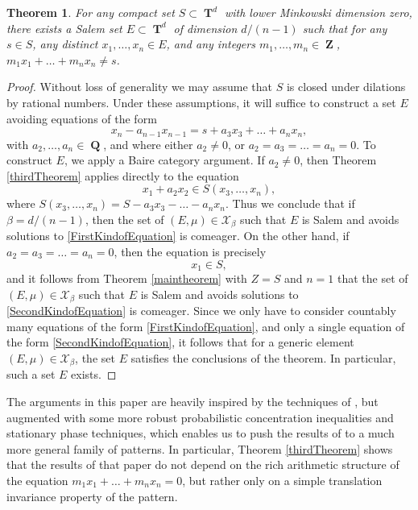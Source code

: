 \documentclass[dvipsnames,letterpaper,12pt]{article}
\numberwithin{equation}{section}
\DeclareMathOperator{\ZZ}{\mathbf{Z}}
\DeclareMathOperator{\QQ}{\mathbf{Q}}
\DeclareMathOperator{\TT}{\mathbf{T}}
\newtheorem{theorem}{Theorem}
\numberwithin{theorem}{section}
\begin{document}
\begin{theorem} \label{dDimensionalKornerResult}
    For any compact set $S \subset \TT^d$ with lower Minkowski dimension zero, there exists a Salem set $E \subset \TT^d$ of dimension $d/(n-1)$ such that for any $s \in S$, any distinct $x_1,\dots,x_n \in E$, and any integers $m_1,\dots,m_n \in \ZZ$, $m_1x_1 + \dots + m_nx_n \neq s$.
\end{theorem}
\begin{proof}
    Without loss of generality we may assume that $S$ is closed under dilations by rational numbers. Under these assumptions, it will suffice to construct a set $E$ avoiding equations of the form
    \[ x_n - a_{n-1} x_{n-1} = s + a_3x_3 + \dots + a_nx_n, \]
    with $a_2,\dots,a_n \in \QQ$, and where either $a_2 \neq 0$, or $a_2 = a_3 = \dots = a_n = 0$. To construct $E$, we apply a Baire category argument. If $a_2 \neq 0$, then Theorem \ref{thirdTheorem} applies directly to the equation
    \begin{equation} \label{FirstKindofEquation}
        x_1 + a_2 x_2 \in S(x_3,\dots,x_n),
    \end{equation}
    where $S(x_3,\dots,x_n) = S - a_3x_3 - \dots - a_nx_n$. Thus we conclude that if $\beta = d/(n-1)$, then the set of $(E,\mu) \in \mathcal{X}_\beta$ such that $E$ is Salem and avoids solutions to \eqref{FirstKindofEquation} is comeager. On the other hand, if $a_2 = a_3 = \dots = a_n = 0$, then the equation is precisely
    \begin{equation} \label{SecondKindofEquation}
        x_1 \in S,
    \end{equation}
    and it follows from Theorem \ref{maintheorem} with $Z = S$ and $n = 1$ that the set of $(E,\mu) \in \mathcal{X}_\beta$ such that $E$ is Salem and avoids solutions to \eqref{SecondKindofEquation} is comeager. Since we only have to consider countably many equations of the form \eqref{FirstKindofEquation}, and only a single equation of the form \eqref{SecondKindofEquation}, it follows that for a generic element $(E,\mu) \in \mathcal{X}_\beta$, the set $E$ satisfies the conclusions of the theorem. In particular, such a set $E$ exists.
\end{proof}

The arguments in this paper are heavily inspired by the techniques of \cite{Korner2}, but augmented with some more robust probabilistic concentration inequalities and stationary phase techniques, which enables us to push the results of \cite{Korner2} to a much more general family of patterns. In particular, Theorem \ref{thirdTheorem} shows that the results of that paper do not depend on the rich arithmetic structure of the equation $m_1x_1 + \dots + m_nx_n = 0$, but rather only on a simple translation invariance property of the pattern.
\end{document}
